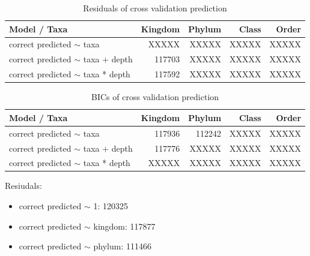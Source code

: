       \begin{table}[h]
        \begin{center}
          \begin{tabular}{ |l|r|r|r|r| }
            \hline
            Model / Taxa & Kingdom & Phylum & Class & Order \\
            \hline \hline
            correct predicted $\sim$ taxa & XXXXX & XXXXX & XXXXX & XXXXX \\
            \hline
            correct predicted $\sim$ taxa + depth & 117703 & XXXXX & XXXXX & XXXXX \\
            \hline
            correct predicted $\sim$ taxa * depth & 117592 & XXXXX & XXXXX & \cellcolor{green!60}XXXXX \\
            \hline
          \end{tabular} 
        \end{center}
        \caption{Residuals of cross validation prediction}
        \label{table:Residuals cross validation} 
      \end{table}

      \begin{table}[h]
        \begin{center}
          \begin{tabular}{ |l|r|r|r|r| }
            \hline
            Model / Taxa & Kingdom & Phylum & Class & Order \\
            \hline \hline
            correct predicted $\sim$ taxa & 117936 & 112242 & XXXXX & XXXXX \\
            \hline
            correct predicted $\sim$ taxa + depth & 117776 & XXXXX & XXXXX & XXXXX \\
            \hline
            correct predicted $\sim$ taxa * depth & XXXXX & XXXXX & XXXXX & \cellcolor{green!60}XXXXX \\
            \hline
          \end{tabular} 
        \end{center}
        \caption{BICs of cross validation prediction}
        \label{table:BIC cross validation} 
      \end{table}

      Resiudals:
      \begin{itemize}
        \item correct predicted $\sim$ 1: 120325
        \item correct predicted $\sim$ kingdom: 117877
        \item correct predicted $\sim$ phylum: 111466
      \end{itemize}

